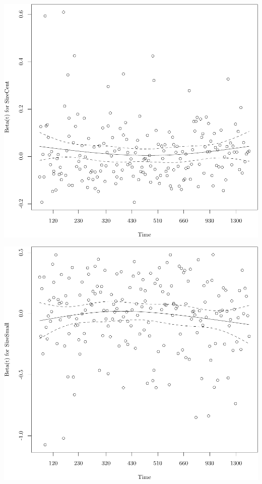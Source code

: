 \documentclass{article}
\begin{document}
\begin{knitrout}
{\centering \includegraphics[width=\maxwidth]{figure/05-eda-ph-check-full-3-4} 

}




{\centering \includegraphics[width=\maxwidth]{figure/05-eda-ph-check-full-3-5} 

}





\end{knitrout}
\end{document}
